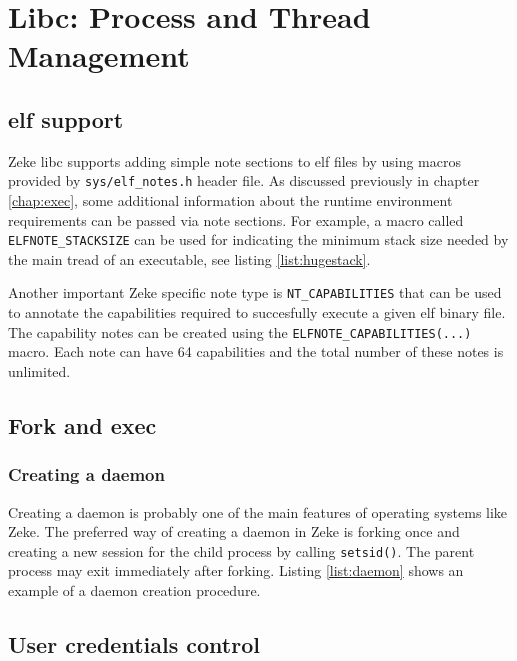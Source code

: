 \chapter{Libc: Process and Thread Management}

\section{\acs{elf} support}\label{sec:libc_elf}

Zeke libc supports adding simple note sections to \acs{elf} files by using
macros provided by \verb+sys/elf_notes.h+ header file. As discussed
previously in chapter \ref{chap:exec}, some additional information about the
runtime environment requirements can be passed via note sections. For example,
a macro called \verb+ELFNOTE_STACKSIZE+ can be used for indicating the minimum
stack size needed by the main tread of an executable, see listing
\ref{list:hugestack}.

Another important Zeke specific note type is \verb+NT_CAPABILITIES+ that
can be used to annotate the capabilities required to succesfully execute
a given elf binary file. The capability notes can be created using the
\verb+ELFNOTE_CAPABILITIES(...)+ macro. Each note can have 64
capabilities and the total number of these notes is unlimited.



\section{Fork and exec}

\subsection{Creating a daemon}

Creating a daemon is probably one of the main features of operating systems
like Zeke. The preferred way of creating a daemon in Zeke is forking once and
creating a new session for the child process by calling \verb+setsid()+. The
parent process may exit immediately after forking. Listing \ref{list:daemon}
shows an example of a daemon creation procedure.



\section{User credentials control}

